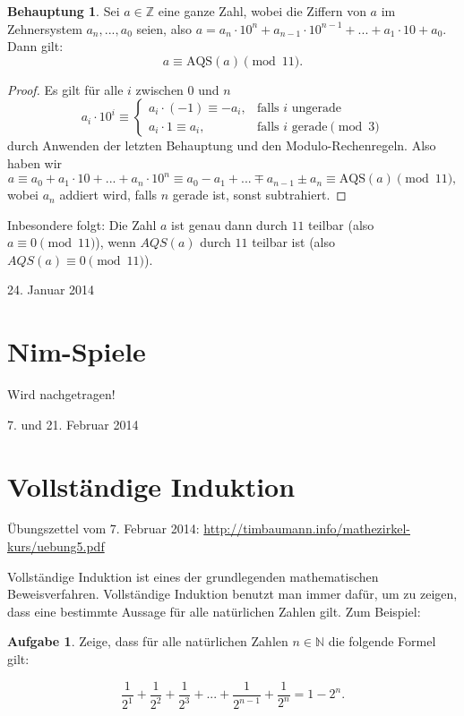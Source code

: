 \documentclass[a4paper,ngerman,12pt]{scrartcl}
\newcommand{\N}{\mathbb{N}}
\newcommand{\Z}{\mathbb{Z}}
\newcommand{\datum}[1]{\hfill {#1}\\}
\theoremstyle{definition}
\newtheorem{satz}{Behauptung}
\newtheorem*{aufg}{Aufgabe}
\begin{document}
\begin{satz}
  Sei $a \in \Z$ eine ganze Zahl, wobei die Ziffern von $a$ im Zehnersystem $a_n, ..., a_0$ seien, also $a = a_n \cdot 10^n + a_{n-1} \cdot 10^{n-1} + ... + a_1 \cdot 10 + a_0$. Dann gilt:
  \[ a \equiv \mathrm{AQS}(a) \pmod{11}. \]
\end{satz}

\begin{proof}
  Es gilt für alle $i$ zwischen $0$ und $n$
  \[ a_i \cdot 10^i \equiv \begin{cases} a_i \cdot (-1) \equiv -a_i, & \text{falls $i$ ungerade} \\ a_i \cdot 1 \equiv a_i, & \text{falls $i$ gerade} \pmod{3} \end{cases} \]
  durch Anwenden der letzten Behauptung und den Modulo-Rechenregeln. Also haben wir
  \[ a \equiv a_0 + a_1 \cdot 10 + ... + a_n \cdot 10^n \equiv a_0 - a_1 + ... \mp a_{n-1} \pm a_n \equiv \mathrm{AQS}(a) \pmod{11}, \]
  wobei $a_n$ addiert wird, falls $n$ gerade ist, sonst subtrahiert.
\end{proof}

Inbesondere folgt: Die Zahl $a$ ist genau dann durch $11$ teilbar (also $a \equiv 0 \pmod{11}$), wenn $AQS(a)$ durch $11$ teilbar ist (also $AQS(a) \equiv 0 \pmod{11}$).

\datum{24. Januar 2014}

\section{Nim-Spiele}

Wird nachgetragen!

\datum{7. und 21. Februar 2014}

\section{Vollständige Induktion}

Übungszettel vom 7. Februar 2014: \mbox{\url{http://timbaumann.info/mathezirkel-kurs/uebung5.pdf}}

Vollständige Induktion ist eines der grundlegenden mathematischen Beweisverfahren. Vollständige Induktion benutzt man immer dafür, um zu zeigen, dass eine bestimmte Aussage für alle natürlichen Zahlen gilt. Zum Beispiel:

\begin{aufg}
  Zeige, dass für alle natürlichen Zahlen $n \in \N$ die folgende Formel gilt:

  \[ \frac{1}{2^1} + \frac{1}{2^2} + \frac{1}{2^3} + ... + \frac{1}{2^{n-1}} + \frac{1}{2^n} = 1 - 2^n. \]
\end{aufg}
\end{document}
